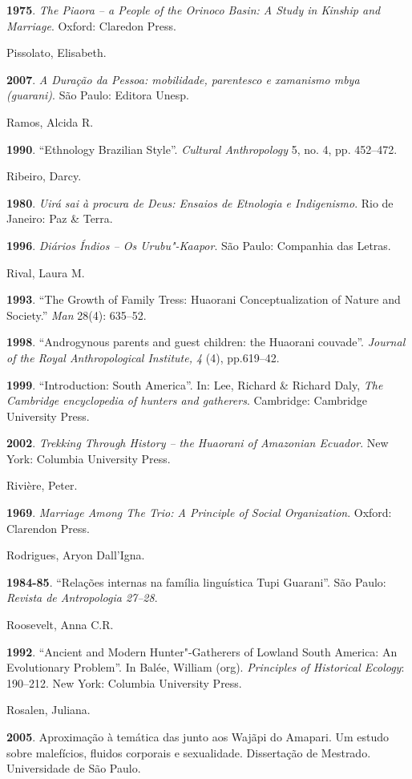 \begin{Parskip}
\textbf{1975}. \emph{The Piaora -- a People of the Orinoco Basin: A Study
in Kinship and Marriage}. Oxford: Claredon Press.

Pissolato, Elisabeth.

\textbf{2007}. \emph{A Duração da Pessoa: mobilidade, parentesco e
xamanismo mbya (guarani)}. São Paulo: Editora Unesp.

Ramos, Alcida R.

\textbf{1990}. ``Ethnology Brazilian Style''. \emph{Cultural Anthropology}
5, no. 4, pp. 452--472.

Ribeiro, Darcy.

\textbf{1980}. \emph{Uirá sai à procura de Deus: Ensaios de Etnologia e
Indigenismo}. Rio de Janeiro: Paz \& Terra.

\textbf{1996}. \emph{Diários Índios -- Os Urubu"-Kaapor}. São Paulo:
Companhia das Letras.

Rival, Laura M.

\textbf{1993}. ``The Growth of Family Tress: Huaorani Conceptualization
of Nature and Society.'' \emph{Man} 28(4): 635--52.

\textbf{1998}. ``Androgynous parents and guest children: the Huaorani
couvade''. \emph{Journal of the Royal Anthropological Institute, 4} (4),
pp.619--42.

\textbf{1999}. ``Introduction: South America''. In: Lee, Richard \& Richard
Daly, \emph{The Cambridge encyclopedia of hunters and gatherers}.
Cambridge: Cambridge University Press.

\textbf{2002}. \emph{Trekking Through History -- the Huaorani of
Amazonian Ecuador}. New York: Columbia University Press.

Rivière, Peter.

\textbf{1969}. \emph{Marriage Among The Trio: A Principle of Social
Organization}. Oxford: Clarendon Press.

Rodrigues, Aryon Dall'Igna.

\textbf{1984-85}. ``Relações internas na família linguística Tupi
Guarani''. São Paulo: \emph{Revista de Antropologia 27--28}.

Roosevelt, Anna C.R.

\textbf{1992}. ``Ancient and Modern Hunter"-Gatherers of Lowland South
America: An Evolutionary Problem''. In Balée, William (org).
\emph{Principles of Historical Ecology}: 190--212. New York: Columbia
University Press.

Rosalen, Juliana.

\textbf{2005}. Aproximação à temática das  junto aos Wajãpi do
Amapari. Um estudo sobre malefícios, fluidos corporais e sexualidade.
Dissertação de Mestrado. Universidade de São Paulo.


\end{Parskip}
